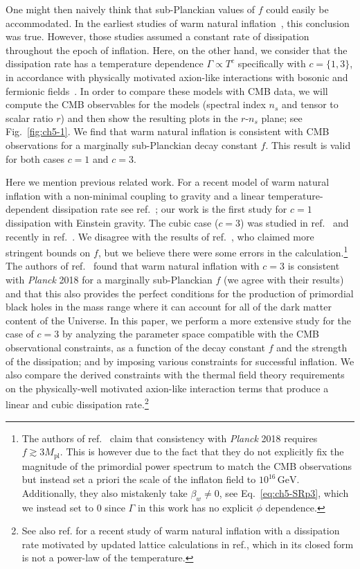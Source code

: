 One might then naively think that sub-Planckian values of $f$ could easily be accommodated. In the earliest studies of warm natural inflation~\cite{Visinelli:2011jy}, this conclusion was true. However, those studies assumed a constant rate of dissipation throughout the epoch of inflation. Here, on the other hand, we consider that the dissipation rate has a temperature dependence $\Gamma \propto T^c$ specifically with $c=\{1,3\}$, in accordance with physically motivated axion-like interactions with bosonic and fermionic fields~\cite{Visinelli:2014qla, Visinelli:2016rhn, Berghaus:2019whh, Berghaus:2020ekh, DeRocco:2021rzv}. In order to compare these models with CMB data, we will compute the CMB observables for the models (spectral index $n_s$ and tensor to scalar ratio $r$) and then show the resulting plots in the $r$-$n_s$ plane; see Fig.~\ref{fig:ch5-1}. We find that warm natural inflation is consistent with CMB observations for a marginally sub-Planckian decay constant $f$. This result is valid for both cases $c=1$ and $c=3$.

Here we mention previous related work.
For a recent model of warm natural inflation with a non-minimal coupling to gravity and a linear temperature-dependent dissipation rate see ref.~\cite{AlHallak:2022haa}; our work is the first study for $c=1$ dissipation with Einstein gravity. The cubic case ($c=3$) was studied in ref.~\cite{Reyimuaji:2020bkm} and recently in ref.~\cite{Correa:2022ngq}. We disagree with the results of ref.~\cite{Reyimuaji:2020bkm}, who claimed more stringent bounds on $f$, but we believe there were some errors in the calculation.\footnote{The authors of ref.~\cite{Reyimuaji:2020bkm} claim that consistency with \textit{Planck} 2018 requires $f\gtrsim 3 M_{\mathrm{pl}}$. This is however due to the fact that they do not explicitly fix the magnitude of the primordial power spectrum to match the CMB observations but instead set a priori the scale of the inflaton field to $10^{16}\,\mathrm{GeV}$.
Additionally, they also mistakenly take $\beta_w\neq 0$, see Eq.~\ref{eq:ch5-SRp3}, which we instead set to $0$ since $\Gamma$ in this work has no explicit $\phi$ dependence.} The authors of ref.~\cite{Correa:2022ngq} found that warm natural inflation with $c=3$ is consistent with \textit{Planck} 2018 for a marginally sub-Planckian $f$ (we agree with their results) and that this also provides the perfect conditions for the production of primordial black holes in the mass range where it can account for all of the dark matter content of the Universe. In this paper, we perform a more extensive study for the case of $c=3$ by analyzing the parameter space compatible with the CMB observational constraints, as a function of the decay constant $f$ and the strength of the dissipation; and by imposing various constraints for successful inflation. We also compare the derived constraints with the thermal field theory requirements on the physically-well motivated axion-like interaction terms that produce a linear and cubic dissipation rate.\footnote{See also ref.\cite{Klose:2022rxh} for a recent study of warm natural inflation with a dissipation rate motivated by updated lattice calculations in ref.\cite{Laine:2022ytc}, which in its closed form is not a power-law of the temperature.}

